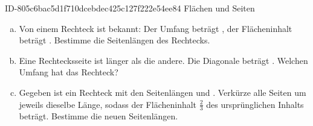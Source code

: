 \begin{exercise}
      {ID-805c6bac5d1f710dcebdec425c127f222e54ee84}
      {Flächen und Seiten}
  \ifproblem\problem
    \begin{enumerate}[a)]
      \item Von einem Rechteck ist bekannt: Der Umfang beträgt , der
            Flächeninhalt beträgt . Bestimme die Seitenlängen des Rechtecks.
      \item Eine Rechtecksseite ist  länger als die andere. Die Diagonale
            beträgt . Welchen Umfang hat das Rechteck?
      \item Gegeben ist ein Rechteck mit den Seitenlängen  und .
            Verkürze alle Seiten um jeweils dieselbe Länge, sodass der Flächeninhalt
            $\frac{2}{3}$ des ursprünglichen Inhalts beträgt. Bestimme die neuen
            Seitenlängen.
    \end{enumerate}
  \fi
\end{exercise}
